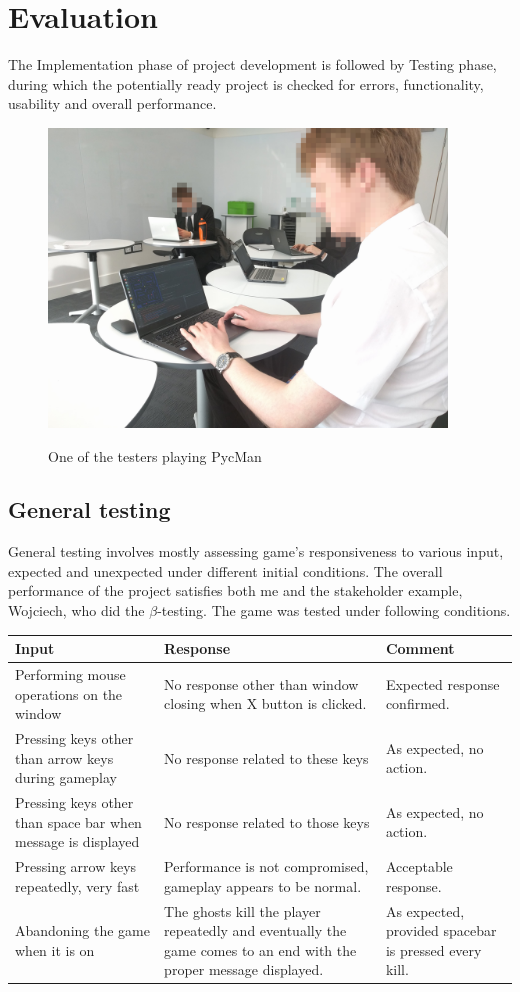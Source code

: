 \documentclass[11pt,a4paper,notitlepage]{report}
\newenvironment{img}{
	\begin{center}
		\begin{figure}[H]
			\begin{center}
			
}{
	\end{center}
		\end{figure}
			\end{center}
}
\begin{document}
	\chapter{Evaluation}
		The Implementation phase of project development is followed by Testing phase, during which the potentially ready project is checked for errors, functionality, usability and overall performance.
		\begin{img}
			\includegraphics[width=300pt]{images/tester.jpg}\\
			\caption{One of the testers playing PycMan}
		\end{img}
		\section{General testing}
			General testing involves mostly assessing game's responsiveness to various input, expected and unexpected under different initial conditions.
			The overall performance of the project satisfies both me and the stakeholder example, Wojciech, who did the $\beta$-testing.
			The game was tested under following conditions.\\
			\begin{center}
				\begin{tabular}{ | p{4cm} | p{4cm} | p{3cm} |}
					\hline
					Input&Response&Comment \\ \hline
					Performing mouse operations on the window&No response other than window closing when X button is clicked.&Expected response confirmed.\\ \hline
					Pressing keys other than arrow keys during gameplay&No response related to these keys&As expected, no action.\\ \hline
					Pressing keys other than space bar when message is displayed&No response related to those keys&As expected, no action.\\ \hline
					Pressing arrow keys repeatedly, very fast&Performance is not compromised, gameplay appears to be normal.&Acceptable response.\\ \hline
					Abandoning the game when it is on&The ghosts kill the player repeatedly and eventually the game comes to an end with the proper message displayed.&As expected, provided spacebar is pressed every kill.\\ \hline
				\end{tabular}
			\end{center}
		\newpage
\end{document}
